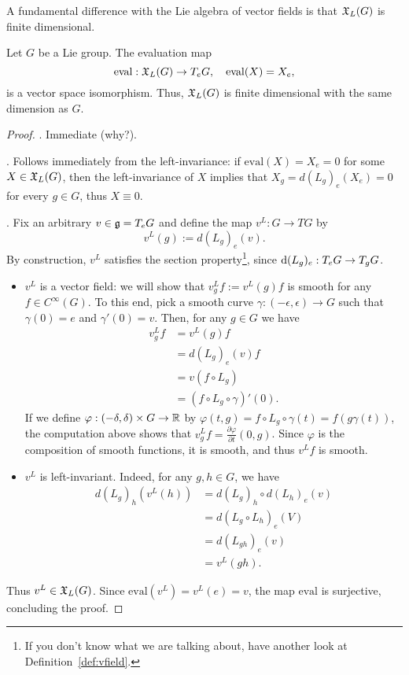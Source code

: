 A fundamental difference with the Lie algebra of vector fields is that $\mathfrak{X}_L(G)$ is finite dimensional.

\begin{theorem}
  Let $G$ be a Lie group. The evaluation map 
  \begin{equation}
    \mathrm{eval}:\mathfrak{X}_L(G)\to T_eG, \quad
    \mathrm{eval}(X) = X_e,
  \end{equation}
  is a vector space isomorphism.
  Thus, $\mathfrak{X}_L(G)$ is finite dimensional with the same dimension as $G$.
\end{theorem}
\begin{proof}
    . Immediate (why?).

    . Follows immediately from the left-invariance: if $\mathrm{eval}(X) = X_e = 0$ for some $X\in\mathfrak{X}_L(G)$, then the left-invariance of $X$ implies that $X_g = d(L_g)_e(X_e) = 0$ for every $g\in G$, thus $X\equiv0$.
    
    .
    Fix an arbitrary $v\in \mathfrak{g} = T_eG$ and define the map $v^L:G\to TG$ by
    \begin{equation}
      v^L(g) := d(L_g)_e(v).
    \end{equation}
    By construction, $v^L$ satisfies the section property\footnote{If you don't know what we are talking about, have another look at Definition~\ref{def:vfield}.}, since $\operatorname{d}(L_g)_e:T_eG\to T_gG$.
    \begin{itemize}
      \item $v^L$ is a vector field: we will show that $v^L_g f := v^L(g) f$ is smooth for any $f\in C^\infty(G)$.
      To this end, pick a smooth curve $\gamma:(-\epsilon,\epsilon)\to G$ such that $\gamma(0)=e$ and $\gamma'(0) = v$. Then, for any $g\in G$ we have
      \begin{align}
        v^L_g f &= v^L(g) f \\
        &= d(L_g)_e(v) f\\
        &= v(f\circ L_g) \\
        &= (f\circ L_g\circ \gamma)'(0).
      \end{align}
      If we define $\varphi:(-\delta, \delta)\times G \to \mathbb{R}$ by $\varphi(t,g) = f\circ L_g\circ \gamma(t) = f(g\gamma(t))$, the computation above shows that $v^L_gf = \frac{\partial \varphi}{\partial t}(0, g)$.
      Since $\varphi$ is the composition of smooth functions, it is smooth, and thus $v^L f$ is smooth.
      \item $v^L$ is left-invariant. 
      Indeed, for any $g,h\in G$, we have
      \begin{align}
        d(L_g)_h(v^L(h)) &= d(L_g)_h\circ d(L_h)_e(v)\\ 
        &= d(L_g\circ L_h)_e(V)\\
        &= d(L_{gh})_e(v)\\
        &= v^L(gh).
      \end{align}
    \end{itemize}
    Thus $v^L\in\mathfrak{X}_L(G)$.
    Since $\mathrm{eval}(v^L) = v^L(e) = v$, the map $\mathrm{eval}$ is surjective, concluding the proof.
\end{proof}


